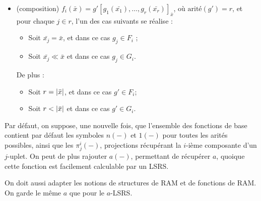 \documentclass{report}
\begin{document}
\begin{definition}[$a$-LSRS]
\begin{itemize}[itemsep=-1mm]
				\item 	(composition)	$f_i\left(\bar{x}\right) = g'\left[ g_1\left(\bar{x_1}\right), \dots, g_r\left(\bar{x_r}\right) \right]_{\bar{x}}$, où $\text{arité}(g') = r$, et pour chaque $j \in r$, l'un des cas suivants se réalise : 
						\begin{itemize}
							\item 	Soit $\bar{x_j} = \bar{x}$, et dans ce cas $g_j \in F_i$ ;
							\item 	Soit $\bar{x_j} \ll \bar{x}$ et dans ce cas $g_j \in G_i$. 
						\end{itemize}
						De plus :
						\begin{itemize}
							\item 	Soit $r = \left|\bar{x}\right|$, et dans ce cas $g' \in F_i$\footnotemark ;
							\item 	Soit $r < \left|\bar{x}\right|$ et dans ce cas $g' \in G_i$. 
						\end{itemize}
						
			\end{itemize}
			
		\end{definition}
		
		\begin{remark}
			\label{rk:fonctions_de_base_LSRS}
			Par défaut, on suppose, une nouvelle fois, que l'ensemble des fonctions de base contient par défaut les symboles $n(-)$ et $1(-)$ pour toutes les arités possibles, ainsi que les $\pi^i_j(-)$, projections récupérant la $i$-ième composante d'un $j$-uplet. On peut de plus rajouter $a(-)$, permettant de récupérer $a$, quoique cette fonction est facilement calculable par un LSRS.
		\end{remark}
		
		On doit aussi adapter les notions de structures de RAM et de fonctions de RAM. On garde le même $a$ que pour le $a$-LSRS.
		
\end{document}
